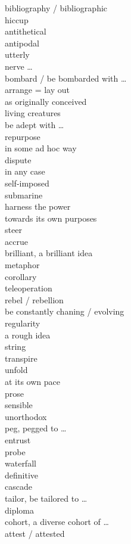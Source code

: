 \documentclass[12pt]{article}
\begin{document}
bibliography / bibliographic \\
hiccup \\
antithetical \\
antipodal \\
utterly \\
nerve \dots \\
bombard / be bombarded with \dots \\
arrange = lay out \\
as originally conceived \\
living creatures \\
be adept with \dots \\
repurpose \\
in some ad hoc way \\
dispute \\
in any case \\
self-imposed \\
submarine \\
harness the power \\
towards its own purposes \\
steer \\
accrue \\
brilliant, a brilliant idea \\
metaphor \\
corollary \\
teleoperation \\
rebel / rebellion \\
be constantly chaning / evolving \\
regularity \\
a rough idea \\
string \\
transpire \\
unfold \\
at its own pace \\
prose \\
sensible \\
unorthodox \\
peg, pegged to \dots \\
entrust \\
probe \\
waterfall \\
definitive \\
cascade \\
tailor, be tailored to \dots \\
diploma \\
cohort, a diverse cohort of \dots \\
attest / attested \\
\end{document}
